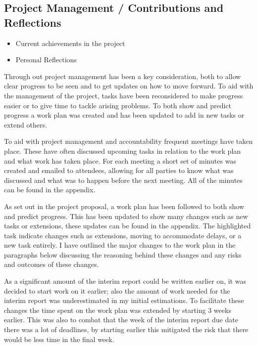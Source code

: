 \documentclass[a4paper]{article}
\begin{document}
\subsection{Project Management / Contributions and Reflections}
\begin{itemize}
    \item Current achievements in the project
    \item Personal Reflections
\end{itemize}
\par
Through out project management has been a key consideration, both to allow clear progress to be seen and to get updates on how to move forward.
To aid with the management of the project, tasks have been reconsidered to make progress easier or to give time to tackle arising problems.
To both show and predict progress a work plan was created and has been updated to add in new tasks or extend others.
\\ \par
To aid with project management and accountability frequent meetings have taken place.
These have often discussed upcoming tasks in relation to the work plan and what work has taken place.
For each meeting a short set of minutes was created and emailed to attendees, allowing for all parties to know what was discussed and what was to happen before the next meeting.
All of the minutes can be found in the appendix.
\par
As set out in the project proposal, a work plan has been followed to both show and predict progress.
This has been updated to show many changes such as new tasks or extensions, these updates can be found in the appendix.
The highlighted task indicate changes such as extensions, moving to accommodate delays, or a new task entirely.
I have outlined the major changes to the work plan in the paragraphs below discussing the reasoning behind these changes and any risks and outcomes of these changes.
\\ \par
As a significant amount of the interim report could be written earlier on, it was decided to start work on it earlier; also the amount of work needed for the interim report was underestimated in my initial estimations.
To facilitate these changes the time spent on the work plan was extended by starting 3 weeks earlier.
This was also to combat that the week of the interim report due date there was a lot of deadlines, by starting earlier this mitigated the risk that there would be less time in the final week.
\par
\end{document}
